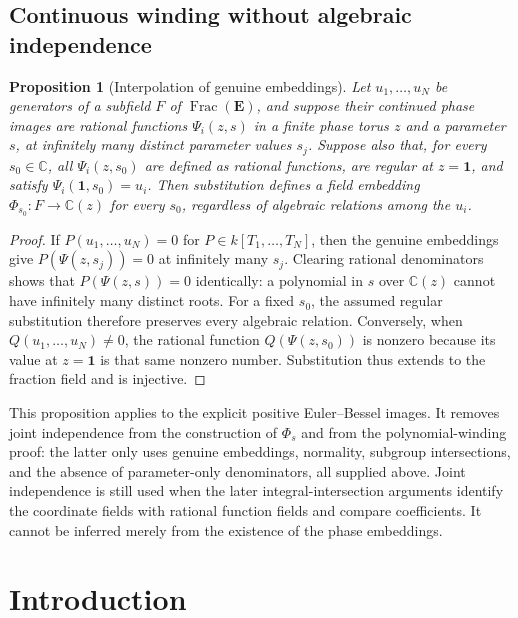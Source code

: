 \documentclass[11pt,a4paper]{article}
\newtheorem{proposition}[theorem]{Proposition}
\theoremstyle{definition}\newtheorem{definition}[theorem]{Definition}
\theoremstyle{remark}\newtheorem{remark}[theorem]{Remark}
\begin{document}
\subsection{Continuous winding without algebraic independence}
\begin{proposition}[Interpolation of genuine embeddings]
\label{foundation:interpolation}
Let $u_1,\ldots,u_N$ be generators of a subfield $F$ of
$\operatorname{Frac}(\mathbf E)$, and suppose their continued phase
images are rational functions $\Psi_i(z,s)$ in a finite phase torus
$z$ and a parameter $s$, at infinitely many distinct parameter values
$s_j$.  Suppose also that, for every $s_0\in\mathbb C$, all
$\Psi_i(z,s_0)$ are defined as rational functions, are regular at
$z=\boldsymbol 1$, and satisfy $\Psi_i(\boldsymbol1,s_0)=u_i$.
Then substitution defines a field embedding $\Phi_{s_0}:F\to
\mathbb C(z)$ for every $s_0$, regardless of algebraic relations among
the $u_i$.
\end{proposition}
\begin{proof}
If $P(u_1,\ldots,u_N)=0$ for $P\in k[T_1,\ldots,T_N]$, then the genuine
embeddings give $P(\Psi(z,s_j))=0$ at infinitely many $s_j$.
Clearing rational denominators shows that $P(\Psi(z,s))=0$ identically:
a polynomial in $s$ over $\mathbb C(z)$ cannot have infinitely many
distinct roots.  For a fixed $s_0$, the assumed regular substitution
therefore preserves every algebraic relation.  Conversely, when
$Q(u_1,\ldots,u_N)\ne0$, the rational function $Q(\Psi(z,s_0))$ is nonzero
because its value at $z=\boldsymbol1$ is that same nonzero number.
Substitution thus extends to the fraction field and is injective.
\end{proof}

This proposition applies to the explicit positive Euler--Bessel images.
It removes joint independence from the construction of $\Phi_s$ and
from the polynomial-winding proof: the latter only uses genuine
embeddings, normality, subgroup intersections, and the absence of
parameter-only denominators, all supplied above.  Joint independence
is still used when the later integral-intersection arguments identify
the coordinate fields with rational function fields and compare
coefficients.  It cannot be inferred merely from the existence of the
phase embeddings.
\section{Introduction}
\end{document}
